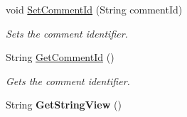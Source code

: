 \begin{DoxyCompactItemize}
\item 
void \hyperlink{classcom_1_1shephertz_1_1app42_1_1paas_1_1sdk_1_1windows_1_1review_1_1_review_a4105961c4c2dfd1f387c957cca588223}{Set\+Comment\+Id} (String comment\+Id)
\begin{DoxyCompactList}\small\item\em Sets the comment identifier. \end{DoxyCompactList}\item 
String \hyperlink{classcom_1_1shephertz_1_1app42_1_1paas_1_1sdk_1_1windows_1_1review_1_1_review_a937012ab79a62e61d1a1e68eabc5c952}{Get\+Comment\+Id} ()
\begin{DoxyCompactList}\small\item\em Gets the comment identifier. \end{DoxyCompactList}\item 
\hypertarget{classcom_1_1shephertz_1_1app42_1_1paas_1_1sdk_1_1windows_1_1review_1_1_review_a8818d03038b6d30fd8027bc0b282a51a}{String {\bfseries Get\+String\+View} ()}\label{classcom_1_1shephertz_1_1app42_1_1paas_1_1sdk_1_1windows_1_1review_1_1_review_a8818d03038b6d30fd8027bc0b282a51a}

\end{DoxyCompactItemize}
